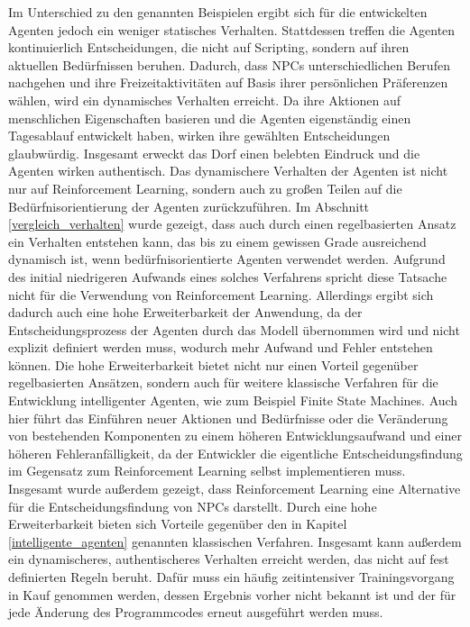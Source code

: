 Im Unterschied zu den genannten Beispielen ergibt sich für die entwickelten Agenten jedoch ein weniger statisches Verhalten. Stattdessen treffen die Agenten kontinuierlich Entscheidungen, die nicht auf Scripting, sondern auf ihren aktuellen Bedürfnissen beruhen. Dadurch, dass NPCs unterschiedlichen Berufen nachgehen und ihre Freizeitaktivitäten auf Basis ihrer persönlichen Präferenzen wählen, wird ein dynamisches Verhalten erreicht. Da ihre Aktionen auf menschlichen Eigenschaften basieren und die Agenten eigenständig einen Tagesablauf entwickelt haben, wirken ihre gewählten Entscheidungen glaubwürdig. Insgesamt erweckt das Dorf einen belebten Eindruck und die Agenten wirken authentisch.
Das dynamischere Verhalten der Agenten ist nicht nur auf Reinforcement Learning, sondern auch zu großen Teilen auf die Bedürfnisorientierung der Agenten zurückzuführen.
Im Abschnitt \ref{vergleich_verhalten} wurde gezeigt, dass auch durch einen regelbasierten Ansatz ein Verhalten entstehen kann, das bis zu einem gewissen Grade ausreichend dynamisch ist, wenn bedürfnisorientierte Agenten verwendet werden. Aufgrund des initial niedrigeren Aufwands eines solches Verfahrens spricht diese Tatsache nicht für die Verwendung von Reinforcement Learning. Allerdings ergibt sich dadurch auch eine hohe Erweiterbarkeit der Anwendung, da der Entscheidungsprozess der Agenten durch das Modell übernommen wird und nicht explizit definiert werden muss, wodurch mehr Aufwand und Fehler entstehen können. Die hohe Erweiterbarkeit bietet nicht nur einen Vorteil gegenüber regelbasierten Ansätzen, sondern auch für weitere klassische Verfahren für die Entwicklung intelligenter Agenten, wie zum Beispiel Finite State Machines. Auch hier führt das Einführen neuer Aktionen und Bedürfnisse oder die Veränderung von bestehenden Komponenten zu einem höheren Entwicklungsaufwand und einer höheren Fehleranfälligkeit, da der Entwickler die eigentliche Entscheidungsfindung im Gegensatz zum Reinforcement Learning selbst implementieren muss.   
Insgesamt wurde außerdem gezeigt, dass Reinforcement Learning eine Alternative für die Entscheidungsfindung von NPCs darstellt. Durch eine hohe Erweiterbarkeit bieten sich Vorteile gegenüber den in Kapitel \ref{intelligente_agenten} genannten klassischen Verfahren. Insgesamt kann außerdem ein dynamischeres, authentischeres Verhalten erreicht werden, das nicht auf fest definierten Regeln beruht. Dafür muss ein häufig zeitintensiver Trainingsvorgang in Kauf genommen werden, dessen Ergebnis vorher nicht bekannt ist und der für jede Änderung des Programmcodes erneut ausgeführt werden muss.










